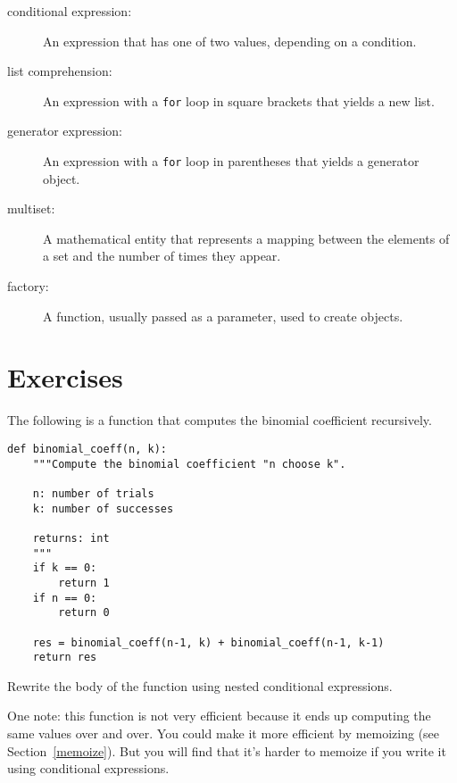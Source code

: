 \documentclass[10pt]{book}
\begin{document}
\begin{description}

\item[conditional expression:] An expression that has one of two
values, depending on a condition.

\item[list comprehension:] An expression with a {\tt for} loop in square
brackets that yields a new list.

\item[generator expression:] An expression with a {\tt for} loop in parentheses
that yields a generator object.  

\item[multiset:] A mathematical entity that represents a mapping
between the elements of a set and the number of times they appear.

\item[factory:] A function, usually passed as a parameter, used to
create objects. 

\end{description}




\section{Exercises}

\begin{exercise}

The following is a function that computes the binomial
coefficient recursively.

\begin{verbatim}
def binomial_coeff(n, k):
    """Compute the binomial coefficient "n choose k".

    n: number of trials
    k: number of successes

    returns: int
    """
    if k == 0:
        return 1
    if n == 0:
        return 0

    res = binomial_coeff(n-1, k) + binomial_coeff(n-1, k-1)
    return res
\end{verbatim}

Rewrite the body of the function using nested conditional
expressions.

One note: this function is not very efficient because it ends up computing
the same values over and over.  You could make it more efficient by
memoizing (see Section~\ref{memoize}).  But you will find that it's harder to
memoize if you write it using conditional expressions.

\end{exercise}
\end{document}
